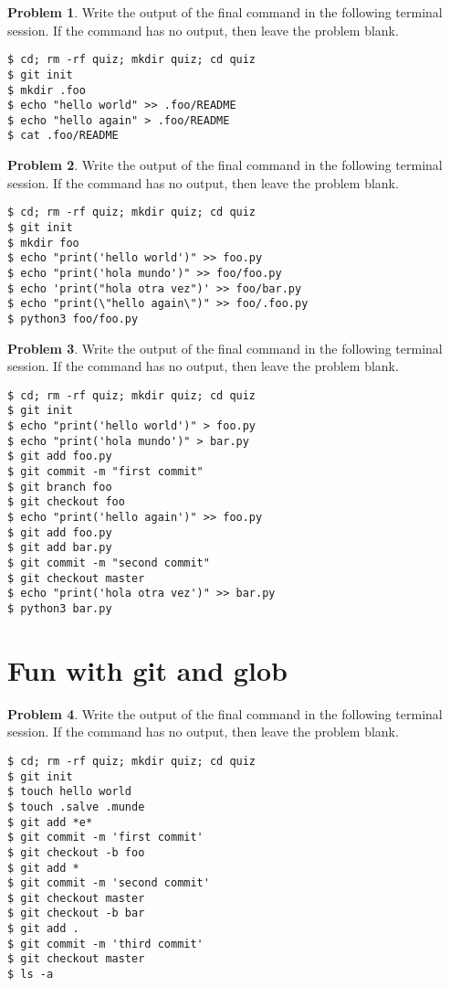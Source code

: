 \documentclass[10pt]{article}
\theoremstyle{definition}
\newtheorem{problem}{Problem}
\begin{document}
\begin{problem}
    Write the output of the final command in the following terminal session.
    If the command has no output, then leave the problem blank.
\end{problem}
\begin{lstlisting}
$ cd; rm -rf quiz; mkdir quiz; cd quiz
$ git init
$ mkdir .foo
$ echo "hello world" >> .foo/README
$ echo "hello again" > .foo/README
$ cat .foo/README
\end{lstlisting}
\vspace{1in}

\begin{problem}
    Write the output of the final command in the following terminal session.
    If the command has no output, then leave the problem blank.
\end{problem}
\begin{lstlisting}
$ cd; rm -rf quiz; mkdir quiz; cd quiz
$ git init
$ mkdir foo
$ echo "print('hello world')" >> foo.py
$ echo "print('hola mundo')" >> foo/foo.py
$ echo 'print("hola otra vez")' >> foo/bar.py
$ echo "print(\"hello again\")" >> foo/.foo.py
$ python3 foo/foo.py
\end{lstlisting}
\vspace{1in}

\begin{problem}
    Write the output of the final command in the following terminal session.
    If the command has no output, then leave the problem blank.
\end{problem}
\begin{lstlisting}
$ cd; rm -rf quiz; mkdir quiz; cd quiz
$ git init
$ echo "print('hello world')" > foo.py
$ echo "print('hola mundo')" > bar.py
$ git add foo.py
$ git commit -m "first commit"
$ git branch foo
$ git checkout foo
$ echo "print('hello again')" >> foo.py
$ git add foo.py
$ git add bar.py
$ git commit -m "second commit"
$ git checkout master
$ echo "print('hola otra vez')" >> bar.py
$ python3 bar.py
\end{lstlisting}

\filbreak
\section{Fun with git and glob}

\begin{problem}
    Write the output of the final command in the following terminal session.
    If the command has no output, then leave the problem blank.
\end{problem}
\begin{lstlisting}
$ cd; rm -rf quiz; mkdir quiz; cd quiz
$ git init
$ touch hello world
$ touch .salve .munde
$ git add *e*
$ git commit -m 'first commit'
$ git checkout -b foo
$ git add *
$ git commit -m 'second commit'
$ git checkout master
$ git checkout -b bar
$ git add .
$ git commit -m 'third commit'
$ git checkout master
$ ls -a
\end{lstlisting}
\end{document}
